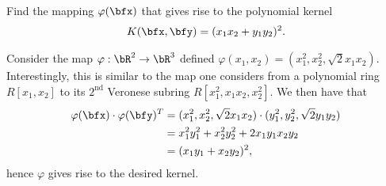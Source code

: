 \begin{homework}[e]
   Find the mapping $\varphi(\bfx)$ that gives rise to the polynomial kernel \begin{align*}
    K(\bfx, \bfy) = (x_1x_2 + y_1y_2)^2.
  \end{align*}
  \begin{prf}
    Consider the map $\varphi:\bR^2 \to \bR^3$ defined $\varphi(x_1,x_2) = (x_1^2, x_2^2, \sqrt{2}x_1x_2)$. Interestingly, this is similar to the map one considers from a polynomial ring $R[x_1,x_2]$ to its $2^{\text{nd}}$ Veronese subring $R[x_1^2,x_1x_2,x_2^2]$. We then have that
    \begin{align*}
      \varphi(\bfx)\cdot \varphi(\bfy)^T
        &= (x_1^2,x_2^2,\sqrt{2}x_1x_2) \cdot (y_1^2,y_2^2, \sqrt{2}y_1y_2) \\
        &= x_1^2y_1^2 + x_2^2y_2^2 + 2x_1y_1x_2y_2 \\
        &= (x_1y_1 + x_2y_2)^2,
    \end{align*}
    hence $\varphi$ gives rise to the desired kernel.
  \end{prf}
\end{homework}

